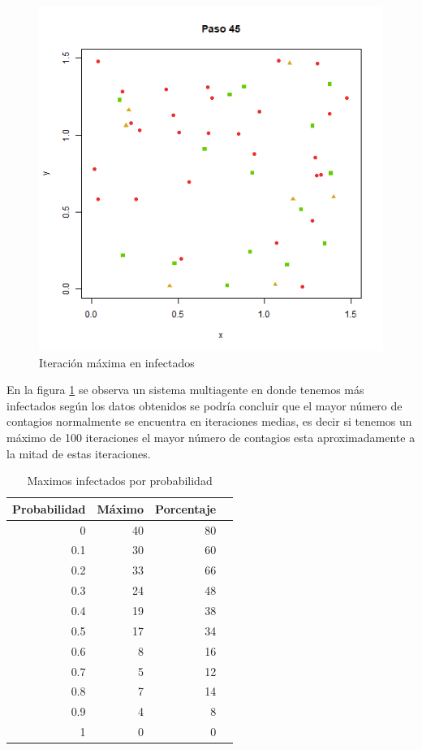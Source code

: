 \documentclass{article}
\begin{document}
\begin{figure}[H]
       \begin{center}
           \includegraphics[width=13cm]{p6_t_t.png}
\end{center}
\caption{Iteraci\'on m\'axima en infectados}
        \label{f2}
\end{figure}
 
En la figura \ref{f2} se observa un sistema multiagente en donde tenemos m\'as infectados seg\'un los datos obtenidos se podr\'ia concluir que el mayor n\'umero de contagios normalmente se encuentra en iteraciones medias, es decir si tenemos un m\'aximo de 100 iteraciones el mayor n\'umero de contagios esta aproximadamente a la mitad de estas iteraciones.

\begin{table}[H]
 \centering
\caption{Maximos infectados por probabilidad}
\begin{tabular}{rrrr}
  \hline
 Probabilidad & M\'aximo & Porcentaje \\ 
  \hline
0 & 40 & 80 \\ 
 0.1 &30  & 60 \\ 
 0.2 & 33&66  \\ 
 0.3 & 24& 48 \\ 
 0.4 &19 & 38\\ 
 0.5 &  17& 34 \\ 
 0.6 & 8 &16 \\ 
 0.7 &  5&12 \\
 0.8 & 7 &14 \\
 0.9 &4  & 8 \\
 1 & 0& 0\\
   \hline
\end{tabular}
\label{t1}
\end{table}
\end{document}
